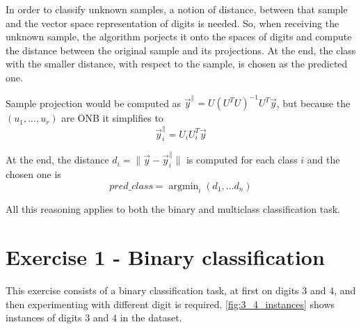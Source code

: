 \documentclass[a4paper,10pt]{report}
\newcommand{\argmin}{\mathop{\mathrm{argmin}}}
\begin{document}
In order to classify unknown samples, a notion of distance, between that sample and the vector space representation of digits is needed.
So, when receiving the unknown sample, the algorithm porjects it onto the spaces of digits and compute the distance between the original sample and its projections.
At the end, the class with the smaller distance, with respect to the sample, is chosen as the predicted one.

Sample projection would be computed as $\vec{y}^\parallel=U(U^TU)^{-1}U^T\vec{y}$, but because the $(u_1,...,u_r)$ are ONB it simplifies to
\begin{equation}
  \vec{y}^\parallel_i=U_iU^T_i\vec{y}
\end{equation}

At the end, the distance $d_i=\|\vec{y}-\vec{y}^\parallel_i\|$ is computed for each class $i$ and the chosen one is 
\begin{equation}
pred\_class=\argmin_i (d_1,...d_n)
\end{equation}

All this reasoning applies to both the binary and multiclass classification task.

\chapter{Exercise 1 - Binary classification}\label{chap:ex1}
This exercise consists of a binary classification task, at first on digits 3 and 4, and then experimenting with different digit is required.
\ref{fig:3_4_instances} shows instances of digits 3 and 4 in the dataset.
\end{document}
